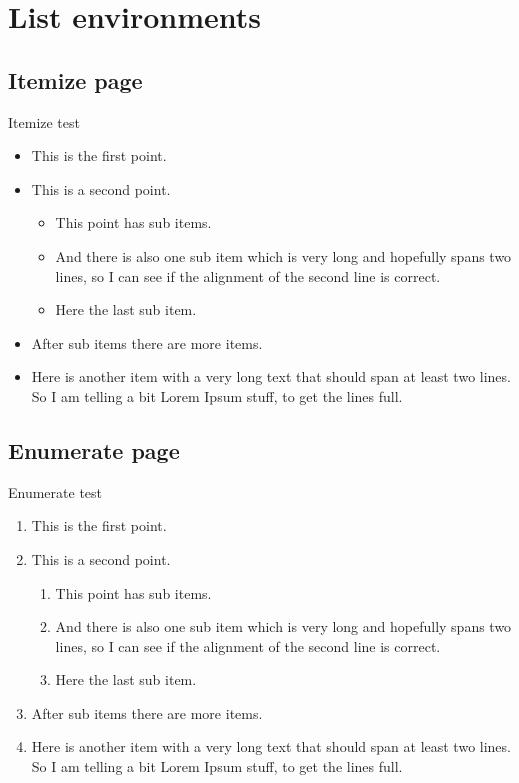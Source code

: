 \section{List environments}
\subsection{Itemize page}
\begin{frame}{Itemize test}
  \begin{itemize}
    \item This is the first point.
    \item This is a second point.
      \begin{itemize}
        \item This point has sub items.
        \item And there is also one sub item which is very long and
          hopefully spans two lines, so I can see if the alignment of
          the second line is correct.
        \item Here the last sub item.
      \end{itemize}
    \item After sub items there are more items.
    \item Here is another item with a very long text that should span at
      least two lines. So I am telling a bit Lorem Ipsum stuff, to get the
      lines full.
  \end{itemize}
\end{frame}

\subsection{Enumerate page}
\begin{frame}{Enumerate test}
  \begin{enumerate}
    \item This is the first point.
    \item This is a second point.
      \begin{enumerate}
        \item This point has sub items.
        \item And there is also one sub item which is very long and
          hopefully spans two lines, so I can see if the alignment of
          the second line is correct.
        \item Here the last sub item.
      \end{enumerate}
    \item After sub items there are more items.
    \item Here is another item with a very long text that should span at
      least two lines. So I am telling a bit Lorem Ipsum stuff, to get the
      lines full.
  \end{enumerate}
\end{frame}

